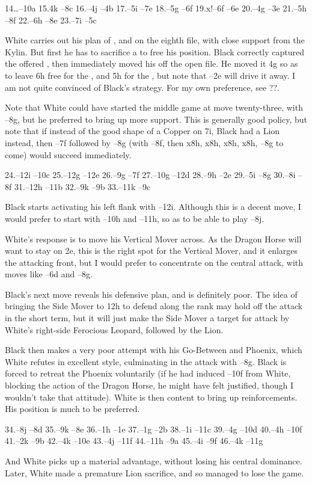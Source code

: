 \documentclass{article}
\begin{document}
14\ldots\Hon--10a 15.\Do4k \Ryu--8c 16.\Do--4j \Do--4b 17.\Do--5i \Ki--7e 18.\Fu--5g \Fu--6f 19.\Shi x!--6f \Shi--6e 20.\Shi--4g \Fu--3e 21.\Do--5h \Fu--8f 22.\Ki--6h \Do--8e 23.\Do--7i \Do--5c



White carries out his plan of \Fu, \Do{} and \Hi{} on the eighth
file, with close support from the Kylin. But first he has to sacrifice
a \Fu{} to free his position. Black correctly captured the offered
\Fu{}, then immediately moved his \Shi{} off the open file. He moved it
4g so as to leave 6h free for the \Ki, and 5h for the \Do, but
note that \Ma--2e will drive it away. I am not quite convinced of
Black's strategy. For my own preference, see ??.

Note that White could have started the middle game at move
twenty-three, with \Fu--8g, but he preferred to bring up more support.
This is generally good policy, but note that if instead of the good
shape of a Copper on 7i, Black had a Lion instead, then \Do--7f followed
by \Fu--8g (with \Ki--8f, then \Fu x8h, \Ki x8h, \Ki x8h, \Ho x8h, \Do--8g to
come) would succeed immediately.

24.\Ko--12i \Ken--10c 25.\Fu--12g \Fu--12e 26.\Chu--9g \Shi--7f 27.\Ho--10g \Ko--12d 28.\Chu--9h \Ma--2e 29.\Shi--5i \Fu--8g 30.\Ho--8i \Do--8f 31.\Ko--12h \Hyo--11b 32.\Gin--9k \Gin--9b 33.\Hyo--11k \Gin--9c



Black starts activating his left flank with \Ko--12i. Although this is a
decent move, I would prefer to start with \Fu--10h and \Ma--11h, so as to
be able to play \Hi--8j.

White's response is to move his Vertical Mover across. As the Dragon
Horse will want to stay on 2e, this is the right spot for the Vertical
Mover, and it enlarges the attacking front, but I would prefer to
concentrate on the central attack, with moves like \Do--6d and \Fu--8g.

Black's next move reveals his defensive plan, and is definitely poor.
The idea of bringing the Side Mover to 12h to defend along the rank
may hold off the attack in the short term, but it will just make the
Side Mover a target for attack by White's right-side Ferocious
Leopard, followed by the Lion.

Black then makes a very poor attempt with his Go-Between and Phoenix,
which White refutes in excellent style, culminating in the attack with
\Fu--8g. Black is forced to retreat the Phoenix voluntarily (if he had
induced \Fu--10f from White, blocking the action of the Dragon Horse, he
might have felt justified, though I wouldn't take that attitude).
White is then content to bring up reinforcements. His position is much
to be preferred.



34.\Gin--8j \Gin--8d 35.\Ma--9k \Gin--8e 36.\Fu--1h \Fu--1e 37.\Fu--1g \Hyo--2b 38.\Ko--1i \Hyo--11c 39.\Chu--4g \Hyo--10d 40.\Fu--4h \Fu--10f 41.\Hyo--2k \Koii--9b 42.\Gin--4k \Hyo--10e 43.\Gin--4j \Hyo--11f 44.\Ko--11h \Kaku--9a 45.\Gin--4i \Shi--9f 46.\Koii--4k \Hyo--11g
   
And White picks up a material advantage, without losing his central
dominance. Later, White made a premature Lion sacrifice, and so
managed to lose the game.
\end{document}
